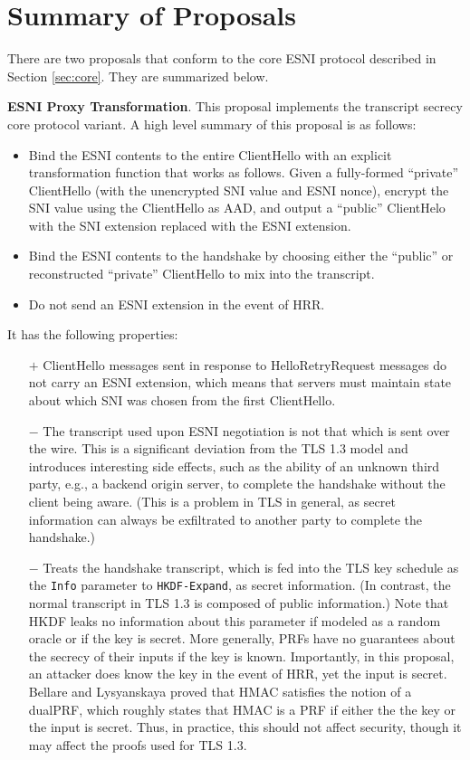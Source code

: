 \documentclass{article}
\theoremstyle{definition}
\theoremstyle{definition}
\begin{document}
\section{Summary of Proposals} \label{sec:proposals}

There are two proposals that conform to the core ESNI protocol described in Section \ref{sec:core}. 
They are summarized below.

\textbf{ESNI Proxy Transformation}. This proposal implements the transcript secrecy core protocol variant. 
A high level summary of this proposal is as follows:
%
\begin{itemize}
  \item Bind the ESNI contents to the entire ClientHello with an explicit transformation function
  that works as follows. Given a fully-formed ``private'' ClientHello (with the unencrypted SNI 
  value and ESNI nonce), encrypt the SNI value using the ClientHello as AAD, and output a ``public'' 
  ClientHelo with the SNI extension replaced with the ESNI extension. 
  \item Bind the ESNI contents to the handshake by choosing either the ``public'' or reconstructed
  ``private'' ClientHello to mix into the transcript. 
  \item Do not send an ESNI extension in the event of HRR.
\end{itemize}
%
It has the following properties:
%
\begin{itemize}
  \item[$+$] ClientHello messages sent in response to HelloRetryRequest messages do not carry an ESNI
  extension, which means that servers must maintain state about which SNI was chosen from the first ClientHello.
  \item[$-$] The transcript used upon ESNI negotiation is not that which is sent over the wire. This is
  a significant deviation from the TLS 1.3 model and introduces interesting side effects, such as the
  ability of an unknown third party, e.g., a backend origin server, to complete the handshake without
  the client being aware. (This is a problem in TLS in general, as secret information can always be
  exfiltrated to another party to complete the handshake.)
  \item[$-$] Treats the handshake transcript, which is fed into the TLS key schedule as the {\tt Info}
  parameter to {\tt HKDF-Expand}, as secret information. (In contrast, the normal transcript in TLS 1.3
  is composed of public information.) Note that HKDF leaks no information about this parameter
  if modeled as a random oracle or if the key is secret. More generally, PRFs have no guarantees about
  the secrecy of their inputs if the key is known. Importantly, in this proposal, an attacker
  does know the key in the event of HRR, yet the input is secret. Bellare and Lysyanskaya \cite{bellare2015symmetric}
  proved that HMAC satisfies the notion of a dualPRF, which roughly states that HMAC is a PRF if 
  either the the key or the input is secret. Thus, in practice, this should not affect security, though
  it may affect the proofs used for TLS 1.3.
\end{itemize}
%
\end{document}
